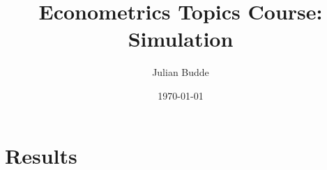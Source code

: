 \documentclass{article}
\title{\Large Econometrics Topics Course: Simulation}
\author{Julian Budde}
\date{\today}
\begin{document}
\maketitle

\tableofcontents

\section{Results}









\end{document}
